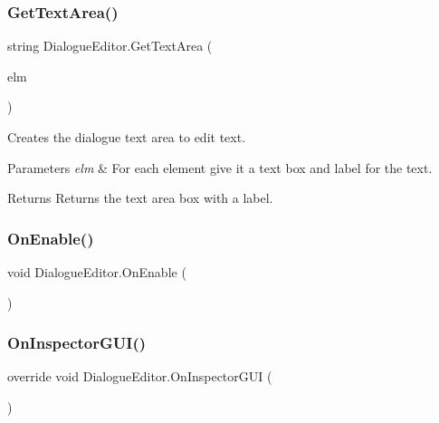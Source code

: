 \subsubsection{\texorpdfstring{Get\+Text\+Area()}{GetTextArea()}}
{\footnotesize\ttfamily string Dialogue\+Editor.\+Get\+Text\+Area (\begin{DoxyParamCaption}\item[{\mbox{\hyperlink{class_dialogue_element}{Dialogue\+Element}}}]{elm }\end{DoxyParamCaption})\hspace{0.3cm}{\ttfamily [private]}}



Creates the dialogue text area to edit text. 


\begin{DoxyParams}{Parameters}
{\em elm} & For each element give it a text box and label for the text.\\
\hline
\end{DoxyParams}
\begin{DoxyReturn}{Returns}
Returns the text area box with a label.
\end{DoxyReturn}
\mbox{\label{class_dialogue_editor_a021f39e2fd0e5ba4c1d325785e73e073}} 
\subsubsection{\texorpdfstring{On\+Enable()}{OnEnable()}}
{\footnotesize\ttfamily void Dialogue\+Editor.\+On\+Enable (\begin{DoxyParamCaption}{ }\end{DoxyParamCaption})\hspace{0.3cm}{\ttfamily [private]}}

\mbox{\label{class_dialogue_editor_ad36b3f14a8f1f1a9d71c716751e9e889}} 
\subsubsection{\texorpdfstring{On\+Inspector\+G\+U\+I()}{OnInspectorGUI()}}
{\footnotesize\ttfamily override void Dialogue\+Editor.\+On\+Inspector\+G\+UI (\begin{DoxyParamCaption}{ }\end{DoxyParamCaption})}



